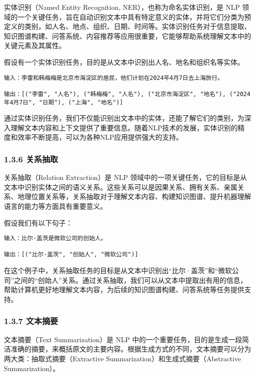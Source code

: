 \documentclass[12pt,a4paper]{book}
\begin{document}
实体识别（Named Entity Recognition, NER），也称为命名实体识别，是 NLP
领域的一个关键任务，旨在自动识别文本中具有特定意义的实体，并将它们分类为预定义的类别，如人名、地点、组织、日期、时间等。实体识别任务对于信息提取、知识图谱构建、问答系统、内容推荐等应用很重要，它能够帮助系统理解文本中的关键元素及其属性。

假设有一个实体识别任务，目的是从文本中识别出人名、地名和组织名等实体。

\begin{verbatim}
输入：李雷和韩梅梅是北京市海淀区的居民，他们计划在2024年4月7日去上海旅行。

输出：[("李雷", "人名"), ("韩梅梅", "人名"), ("北京市海淀区", "地名"), ("2024年4月7日", "日期"), ("上海", "地名")]
\end{verbatim}

通过实体识别任务，我们不仅能识别出文本中的实体，还能了解它们的类别，为深入理解文本内容和上下文提供了重要信息。随着NLP技术的发展，实体识别的精度和效率不断提高，可以为各种NLP应用提供强大的支持。

\subsubsection{1.3.6 关系抽取}\label{ux5173ux7cfbux62bdux53d6}

关系抽取（Relation Extraction）是 NLP
领域中的一项关键任务，它的目标是从文本中识别实体之间的语义关系。这些关系可以是因果关系、拥有关系、亲属关系、地理位置关系等，关系抽取对于理解文本内容、构建知识图谱、提升机器理解语言的能力等方面具有重要意义。

假设我们有以下句子：

\begin{verbatim}
输入：比尔·盖茨是微软公司的创始人。

输出：[("比尔·盖茨", "创始人", "微软公司")]
\end{verbatim}

在这个例子中，关系抽取任务的目标是从文本中识别出``比尔·盖茨''和``微软公司''之间的``创始人''关系。通过关系抽取，我们可以从文本中提取出有用的信息，帮助计算机更好地理解文本内容，为后续的知识图谱构建、问答系统等任务提供支持。

\subsubsection{1.3.7 文本摘要}\label{ux6587ux672cux6458ux8981}

文本摘要（Text Summarization）是 NLP
中的一个重要任务，目的是生成一段简洁准确的摘要，来概括原文的主要内容。根据生成方式的不同，文本摘要可以分为两大类：抽取式摘要（Extractive
Summarization）和生成式摘要（Abstractive Summarization）。
\end{document}
